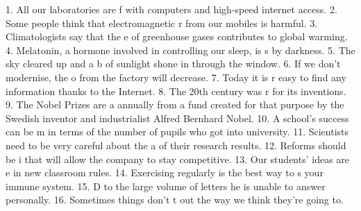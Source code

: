 1. All our laboratories are f\underline{\hspace{2cm}} with computers and high-speed internet access.
2. Some people think that electromagnetic r\underline{\hspace{2cm}} from our mobiles is harmful. 3.
Climatologists say that the e\underline{\hspace{2cm}} of greenhouse gases contributes to global
warming. 4. Melatonin, a hormone involved in controlling our sleep, is s\underline{\hspace{2cm}} by
darkness. 5. The sky cleared up and a b\underline{\hspace{2cm}} of sunlight shone in through the
window. 6. If we don’t modernise, the o\underline{\hspace{2cm}} from the factory will decrease. 7.
Today it is r\underline{\hspace{2cm}} easy to find any information thanks to the Internet. 8. The
20th century was r\underline{\hspace{2cm}} for its inventions. 9. The Nobel Prizes are a\underline{\hspace{2cm}}
annually from a fund created for that purpose by the Swedish inventor and industrialist
Alfred Bernhard Nobel. 10. A school’s success can be m\underline{\hspace{2cm}} in terms of the number
of pupils who got into university. 11. Scientists need to be very careful about the
a\underline{\hspace{2cm}} of their research results. 12. Reforms should be i\underline{\hspace{2cm}} that will
allow the company to stay competitive. 13. Our students’ ideas are e\underline{\hspace{2cm}} in
new classroom rules. 14. Exercising regularly is the best way to s\underline{\hspace{2cm}} your
immune system. 15. D\underline{\hspace{2cm}} to the large volume of letters he is unable to answer
personally. 16. Sometimes things don't t\underline{\hspace{2cm}} out the way we think they're going
to.

